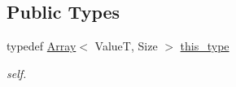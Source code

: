 \subsection*{Public Types}
\begin{DoxyCompactItemize}
\item 
\hypertarget{classhryky_1_1_array_ace26d248a47909ee3875cb7b5a2047e6}{typedef \hyperlink{classhryky_1_1_array}{Array}$<$ Value\-T, Size $>$ \hyperlink{classhryky_1_1_array_ace26d248a47909ee3875cb7b5a2047e6}{this\-\_\-type}}\label{classhryky_1_1_array_ace26d248a47909ee3875cb7b5a2047e6}

\begin{DoxyCompactList}\small\item\em self. \end{DoxyCompactList}\end{DoxyCompactItemize}
